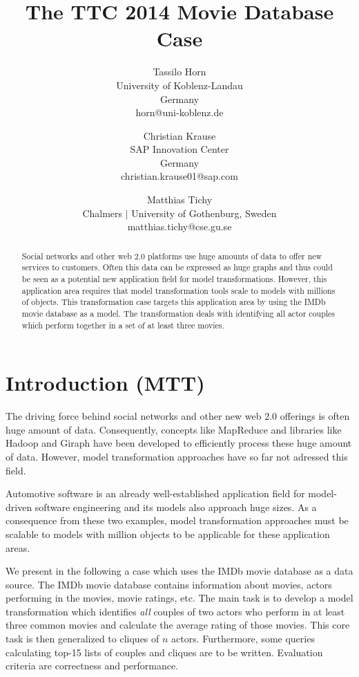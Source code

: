 \documentclass[a4paper,11pt]{article}
\title{The TTC 2014 Movie Database Case}
\author{
Tassilo Horn\\ University of Koblenz-Landau\\ Germany\\ horn@uni-koblenz.de
\and
Christian Krause\\ SAP Innovation Center\\ Germany\\ christian.krause01@sap.com
\and
Matthias Tichy\\ Chalmers $|$ University of Gothenburg, Sweden \\matthias.tichy@cse.gu.se
}
\begin{document}
\maketitle

\begin{abstract}
  Social networks and other web 2.0 platforms use huge amounts of data to offer
  new services to customers. Often this data can be expressed as huge graphs
  and thus could be seen as a potential new application field for model
  transformations. However, this application area requires that model
  transformation tools scale to models with millions of objects. This
  transformation case targets this application area by using the IMDb movie
  database as a model. The transformation deals with identifying all actor
  couples which perform together in a set of at least three movies.
  \end{abstract}
\vskip 32pt


\section{Introduction (MTT)}

The driving force behind social networks and other new web 2.0
offerings is often huge amount of data. Consequently, concepts like
MapReduce \cite{Dean08} and libraries like Hadoop \cite{Hadoop} and
Giraph \cite{Giraph} have been developed to efficiently process these
huge amount of data. However, model transformation approaches have so
far not adressed this field.

Automotive software is an already well-established application field
for model-driven software engineering and its models also approach
huge sizes. As a consequence from these two examples, model
transformation approaches must be scalable to models with million
objects to be applicable for these application areas.

We present in the following a case which uses the IMDb movie database
\cite{IMDBDATA} as a data source. The IMDb movie database contains information
about movies, actors performing in the movies, movie ratings, etc. The main
task is to develop a model transformation which identifies \emph{all} couples
of two actors who perform in at least three common movies and calculate the
average rating of those movies.  This core task is then generalized to cliques
of \(n\) actors.  Furthermore, some queries calculating top-15 lists of
couples and cliques are to be written.  Evaluation criteria are correctness and
performance.
\end{document}
